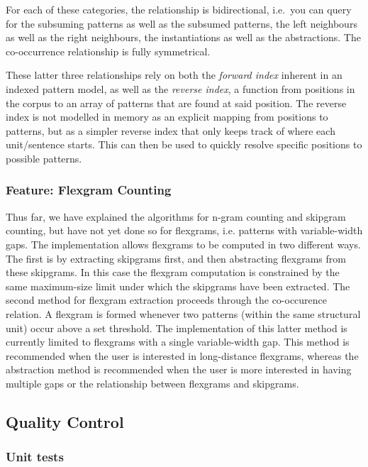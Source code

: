 \documentclass[a4paper,12pt]{article}
\begin{document}
For each of these categories, the relationship is bidirectional, i.e.\ you can
query for the subsuming patterns as well as the subsumed patterns, the left
neighbours as well as the right neighbours, the instantiations as well as the
abstractions. The co-occurrence relationship is fully symmetrical. 

These latter three relationships rely on both the \emph{forward index} inherent
in an indexed pattern model, as well as the \emph{reverse index}, a function
from positions in the corpus to an array of patterns that are found at said
position. The reverse index is not modelled in memory as an explicit mapping from
positions to patterns, but as a simpler reverse index that only keeps track of where
each unit/sentence starts. This can then be used to quickly resolve specific positions
to possible patterns.

\subsubsection{Feature: Flexgram Counting}

Thus far, we have explained the algorithms for n-gram counting and skipgram
counting, but have not yet done so for flexgrams, i.e. patterns with
variable-width gaps. The implementation allows flexgrams to be computed in two
different ways. The first is by extracting skipgrams first, and then
abstracting flexgrams from these skipgrams. In this case the flexgram
computation is constrained by the same maximum-size limit under which the
skipgrams have been extracted.  The second method for flexgram extraction
proceeds through the co-occurence relation. A flexgram is formed whenever two
patterns (within the same structural unit) occur above a set threshold. The
implementation of this latter method is currently limited to flexgrams with a
single variable-width gap. This method is recommended when the user is
interested in long-distance flexgrams, whereas the abstraction method is
recommended when the user is more interested in having multiple gaps or
the relationship between flexgrams and skipgrams.

\subsection{Quality Control}
\label{sec:qc}


\subsubsection{Unit tests}
\end{document}
